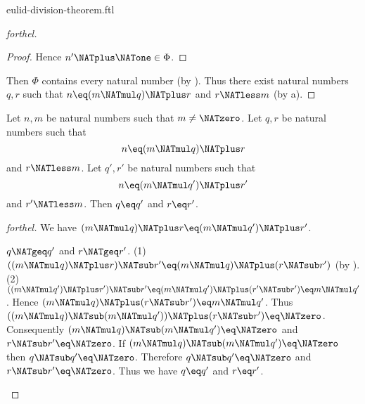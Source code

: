 \documentclass{naproche-library}
\begin{document}
\begin{smodule}[title=Euclid's Division Theorem]{eulid-division-theorem.ftl}
\begin{proof}[forthel]
\begin{proof}
    Hence $n' \NATplus \NATone \in \Phi$.
  \end{proof}

  Then $\Phi$ contains every natural number (by ).
  Thus there exist natural numbers $q, r$ such that $n \eq (m \NATmul q) \NATplus r$ and $r \NATless m$ (by a).
\end{proof}

\begin{theorem}[forthel,title=Euclid's Division Theorem: Uniqueness,id=euclid_uniqueness]
  Let $n, m$ be natural numbers such that $m \neq \NATzero$.
  Let $q, r$ be natural numbers such that
  \[n \eq (m \NATmul q) \NATplus r\]
  and $r \NATless m$.
  Let $q', r'$ be natural numbers such that
  \[n \eq (m \NATmul q') \NATplus r'\]
  and $r' \NATless m$.
  Then $q \eq q'$ and $r \eq r'$.
\end{theorem}
\begin{proof}[forthel]
  We have $(m \NATmul q) \NATplus r \eq (m \NATmul q') \NATplus r'$.

  \begin{case}{$q \NATgeq q'$ and $r \NATgeq r'$.}
    (1) $((m \NATmul q) \NATplus r) \NATsub r' \eq (m \NATmul q) \NATplus (r \NATsub r')$ (by ).
    (2) $((m \NATmul q') \NATplus r') \NATsub r'
      \eq (m \NATmul q') \NATplus (r' \NATsub r')
      \eq m \NATmul q'$.
    Hence $(m \NATmul q) \NATplus (r \NATsub r') \eq m \NATmul q'$.
    Thus $((m \NATmul q) \NATsub (m \NATmul q')) \NATplus (r \NATsub r') \eq \NATzero$.
    Consequently $(m \NATmul q) \NATsub (m \NATmul q') \eq \NATzero$ and $r \NATsub r' \eq \NATzero$.
    If $(m \NATmul q) \NATsub (m \NATmul q') \eq \NATzero$ then $q \NATsub q' \eq \NATzero$.
    Therefore $q \NATsub q' \eq \NATzero$ and $r \NATsub r' \eq \NATzero$.
    Thus we have $q \eq q'$ and $r \eq r'$.
  \end{case}


\end{proof}
\end{smodule}
\end{document}
